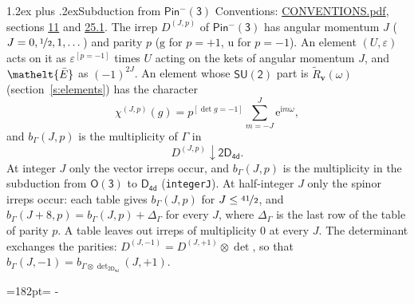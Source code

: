 \documentclass[10pt,a4paper]{article}
\makeatletter
\renewcommand\section{\@startsection{section}{1}{\z@}{-3ex plus -1ex minus -.2ex}%
  {1.2ex plus .2ex}{\normalfont\large\sffamily\bfseries\color{parttitle}}}
\newcommand{\needspace}[1]{\par\penalty-100\begingroup\dimen0=#1\relax\dimen2=\pagegoal
  \advance\dimen2-\pagetotal\ifdim\dimen0>\dimen2\relax\ifdim\dimen2>0pt\vfil\break\fi\fi
  \endgroup}
\numberwithin{equation}{section}
\newcommand{\eltfont}[1]{{\let\sigma\eltsigma\mathelt{#1}}}
\newcommand{\grp}[1]{\mathsf{#1}}
\newcommand{\elt}[1]{\eltfont{#1}}
\newcommand{\ptag}[1]{\mathrm{#1}}
\newcommand{\iverson}[1]{[#1]}
\newcommand{\restr}[2]{#1\!\downarrow#2}
\newcommand{\vv}{\mathbf{v}}
\newcommand{\iunit}{\mathrm{i}}
\newcommand{\expe}{\mathrm{e}}
\newcommand{\irrJp}[2]{D^{(#1,#2)}}
\newcommand{\irrprod}{\otimes}
\newcommand{\barred}[1]{\bar{#1}}
\newcommand{\lift}[1]{\tilde{#1}}
\makeatother
\begin{document}
\section{Subduction from \texorpdfstring{$\grp{Pin^{-}(3)}$}{Pin(3)}}\label{s:subduction_parent}
Conventions: \href{../../CONVENTIONS.pdf}{CONVENTIONS.pdf}, sections \href{../../../rotation/CONVENTIONS.pdf\#conv.11}{11} and \href{../../CONVENTIONS.pdf\#conv.25.1}{25.1}.
\leavevmode\label{n:index.J}\label{n:index.parity}\label{n:irrep.o3}The irrep $\irrJp{J}{p}$ of \href{Pinminus3.pdf}{$\grp{Pin^{-}(3)}$} has angular momentum $J$ ($J = 0, \nicefrac{1}{2}, 1, \dots$) and parity $p$ ($\ptag{g}$ for $p = +1$, $\ptag{u}$ for $p = -1$). An element $(U, \varepsilon)$ acts on it as $\varepsilon^{[p = -1]}$ times $U$ acting on the kets of angular momentum $J$, and $\elt{\barred{E}}$ as $(-1)^{2J}$. \label{n:function.character.parent}\label{n:function.multiplicity}An element whose $\grp{SU(2)}$ part is $\lift{R}_{\vv}(\omega)$ (section~\ref{s:elements}) has the character
\begin{equation}\label{e:chi}\chi^{(J,p)}(g) = p^{\iverson{\det g = -1}}\sum_{m=-J}^{J} \expe^{\iunit m\omega},\end{equation}
and $b_\Gamma(J, p)$ is the multiplicity of $\Gamma$ in
\begin{equation}\label{e:parent}\restr{\irrJp{J}{p}}{\grp{2D_{4d}}}.\end{equation}
At integer $J$ only the vector irreps occur, and $b_\Gamma(J, p)$ is the multiplicity in the subduction from $\grp{O(3)}$ to \href{../../../rotation/data/pdf/D4d.pdf}{$\grp{D_{4d}}$} (\texttt{integerJ}). \label{n:index.increment}At half-integer $J$ only the spinor irreps occur: each table gives $b_\Gamma(J, p)$ for $J \le \nicefrac{41}{2}$, and $b_\Gamma(J + 8, p) = b_\Gamma(J, p) + \Delta_\Gamma$ for every $J$, where $\Delta_\Gamma$ is the last row of the table of parity $p$. A table leaves out irreps of multiplicity 0 at every $J$.
\leavevmode\label{n:operator.determinant.character}The determinant exchanges the parities: $\irrJp{J}{-1} = \irrJp{J}{+1} \irrprod \det$, so that $b_\Gamma(J, -1) = b_{\Gamma \irrprod \det_{\grp{2D_{4d}}}}(J, +1)$.
\needspace{182pt}
\end{document}

